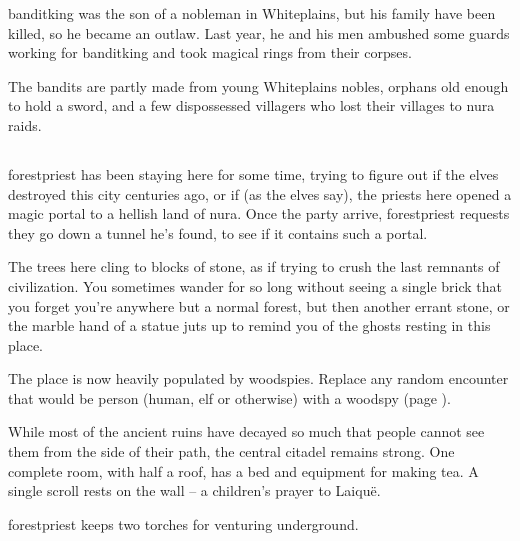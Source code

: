 \begin{multicols}{2}
\banditking

\Gls{banditking} was the son of a nobleman in Whiteplains, but his family have been killed, so he became an outlaw.
Last year, he and his men ambushed some guards working for \gls{banditking} and took magical rings from their corpses.

The bandits are partly made from young Whiteplains nobles, orphans old enough to hold a sword, and a few dispossessed villagers who lost their villages to nura raids.


\subsection{}\label{lostcity}\setcounter{list}{0}


\Gls{forestpriest} has been staying here for some time, trying to figure out if the elves destroyed this city centuries ago, or if (as the elves say), the priests here opened a magic portal to a hellish land of nura.
Once the party arrive, \gls{forestpriest} requests they go down a tunnel he's found, to see if it contains such a portal.

\begin{boxtext}

The trees here cling to blocks of stone, as if trying to crush the last remnants of civilization.  You sometimes wander for so long without seeing a single brick that you forget you're anywhere but a normal forest, but then another errant stone, or the marble hand of a statue juts up to remind you of the ghosts resting in this place.

\end{boxtext}

The place is now heavily populated by woodspies.  Replace any random encounter that would be person (human, elf or otherwise) with a woodspy (page \pageref{woodspy}).

\label{lost_citadel}
While most of the ancient ruins have decayed so much that people cannot see them from the side of their path, the central citadel remains strong.
One complete room, with half a roof, has a bed and equipment for making tea.
A single scroll rests on the wall -- a children's prayer to Laiqu\"{e}.

\Gls{forestpriest} keeps two torches for venturing underground.


\end{multicols}
